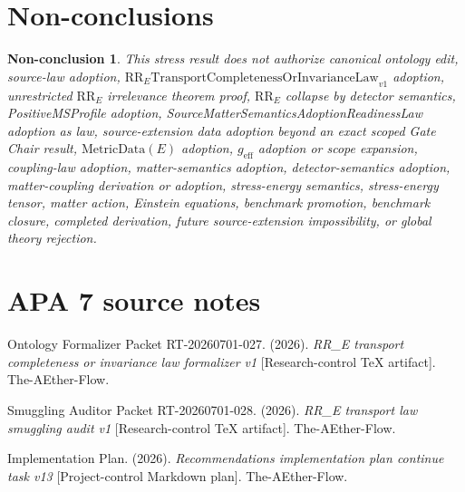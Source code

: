 \documentclass[11pt]{article}
\newcommand{\RRE}{\mathrm{RR}_{E}}
\newcommand{\LawRR}{\mathrm{RR}_{E}\mathrm{TransportCompletenessOrInvarianceLaw}_{v1}}
\newcommand{\MetricData}{\mathrm{MetricData}}
\newcommand{\geff}{g_{\mathrm{eff}}}
\newtheorem{nonconclusion}{Non-conclusion}
\begin{document}
\section{Non-conclusions}

\begin{nonconclusion}
This stress result does not authorize canonical ontology edit, source-law
adoption, \(\LawRR\) adoption, unrestricted \(\RRE\) irrelevance theorem
proof, \(\RRE\) collapse by detector semantics, PositiveMSProfile adoption,
SourceMatterSemanticsAdoptionReadinessLaw adoption as law, source-extension
data adoption beyond an exact scoped Gate Chair result, \(\MetricData(E)\)
adoption, \(\geff\) adoption or scope expansion, coupling-law adoption,
matter-semantics adoption, detector-semantics adoption, matter-coupling
derivation or adoption, stress-energy semantics, stress-energy tensor, matter
action, Einstein equations, benchmark promotion, benchmark closure, completed
derivation, future source-extension impossibility, or global theory rejection.
\end{nonconclusion}

\section{APA 7 source notes}

Ontology Formalizer Packet RT-20260701-027. (2026). \emph{RR\_E transport
completeness or invariance law formalizer v1} [Research-control TeX artifact].
The-AEther-Flow.

Smuggling Auditor Packet RT-20260701-028. (2026). \emph{RR\_E transport law
smuggling audit v1} [Research-control TeX artifact]. The-AEther-Flow.

Implementation Plan. (2026). \emph{Recommendations implementation plan
continue task v13} [Project-control Markdown plan]. The-AEther-Flow.
\end{document}
